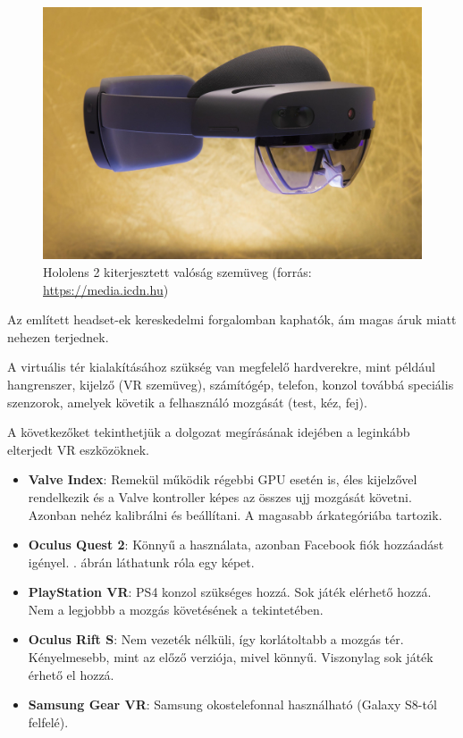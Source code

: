 
\begin{figure}[htp]
    \centering
   	\includegraphics[scale=0.1]{images/holo.jpg}
	\caption{Hololens 2 kiterjesztett valóság szemüveg (forrás: \url{https://media.icdn.hu})}
	\label{fig:hololens}
\end{figure}

Az említett headset-ek kereskedelmi forgalomban kaphatók, ám magas áruk miatt nehezen terjednek. 


A virtuális tér kialakításához szükség van megfelelő hardverekre, mint például hangrenszer, kijelző (VR szemüveg), számítógép, telefon, konzol továbbá speciális szenzorok, amelyek követik a felhasználó mozgását (test, kéz, fej).

A következőket tekinthetjük a dolgozat megírásának idejében a leginkább elterjedt VR eszközöknek.
\begin{itemize}
\item {\bf Valve Index}: Remekül működik régebbi GPU esetén is, éles kijelzővel rendelkezik és a Valve kontroller képes az összes ujj mozgását követni. Azonban nehéz kalibrálni és beállítani. A magasabb árkategóriába tartozik.
\item {\bf Oculus Quest 2}: Könnyű a használata, azonban Facebook fiók hozzáadást igényel. . ábrán láthatunk róla egy képet.
\item {\bf PlayStation VR}: PS4 konzol szükséges hozzá. Sok játék elérhető hozzá. Nem a legjobbb a mozgás követésének a tekintetében.
\item {\bf Oculus Rift S}: Nem vezeték nélküli, így korlátoltabb a mozgás tér.  Kényelmesebb, mint az előző verziója, mivel könnyű. Viszonylag sok játék érhető el hozzá.
\item {\bf Samsung Gear VR}: Samsung okostelefonnal használható (Galaxy S8-tól felfelé).
\end{itemize}

